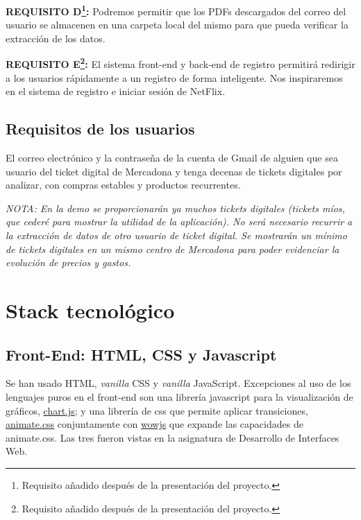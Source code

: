 \documentclass[a4paper,12pt]{report}
\begin{document}
			
			\textbf{REQUISITO D\footnote{Requisito añadido después de la presentación del proyecto.}:} Podremos permitir que los PDFs descargados del correo del usuario se almacenen en una carpeta local del mismo para que pueda verificar la extracción de los datos.
			
			\textbf{REQUISITO E\footnote{Requisito añadido después de la presentación del proyecto.}:} El sistema front-end y back-end de registro permitirá redirigir a los usuarios rápidamente a un registro de forma inteligente. Nos inspiraremos en el sistema de  registro e iniciar sesión de NetFlix.
			
			\subsection{Requisitos de los usuarios}
			
			El correo electrónico y la contraseña de la cuenta de Gmail de alguien que sea usuario del ticket digital de Mercadona y tenga decenas de tickets digitales por analizar, con compras estables y productos recurrentes.
			
			\textit{NOTA: En la demo se proporcionarán ya muchos tickets digitales (tickets míos, que cederé para mostrar la utilidad de la aplicación). No será necesario recurrir a la extracción de datos de otro usuario de ticket digital. Se mostrarán un mínimo de tickets digitales en un mismo centro de Mercadona para poder evidenciar la evolución de precios y gastos.}
			
		
		\section{Stack tecnológico}
	
		
			 \subsection{Front-End: HTML, CSS y Javascript}
			 
			Se han usado HTML, \textit{vanilla} CSS y \textit{vanilla} JavaScript. Excepciones al uso de los lenguajes puros en el front-end son una librería javascript para la visualización de gráficos, \href{https://www.chartjs.org/}{chart.js}\cite{chartjs}; y una librería de css que permite aplicar transiciones, \href{https://animate.style/}{animate.css}\cite{animatecss} conjuntamente con \href{https://wowjs.uk/}{wowjs}\cite{wowjs} que expande las capacidades de animate.css. Las tres fueron vistas en la asignatura de Desarrollo de Interfaces Web.
			
\end{document}
